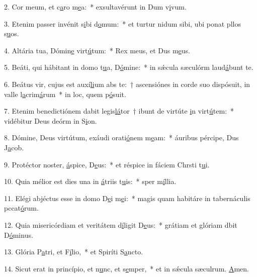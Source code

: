 2. Cor meum, et c\uline{a}ro m\uline{e}a:~* exsultavérunt in Dum v\uline{i}vum.\par 
3. Etenim passer invénit s\uline{i}bi d\uline{o}mum:~* et turtur nidum sibi, ubi ponat pllos s\uline{u}os.\par 
4. Altária tua, Dómin\uline{e} virt\uline{ú}tum:~* Rex meus, et Dus m\uline{e}us.\par 
5. Beáti, qui hábitant in domo t\uline{u}a, D\uline{ó}mine:~* in sǽcula sæculórm laud\uline{á}bunt te.\par 
6. Beátus vir, cujus est auxí\uline{li}um abs te:~† ascensiónes in corde suo dispósuit, in valle l\uline{a}crim\uline{á}rum~* in loc, quem p\uline{ó}suit.\par 
7. Etenim benedictiónem dabit legis\uline{lá}tor~† ibunt de virtúte \uline{i}n virt\uline{ú}tem:~* vidébitur Deus deórm in S\uline{i}on.\par 
8. Dómine, Deus virtútum, exáudi orati\uline{ó}nem m\uline{e}am:~* áuribus pércipe, Dus J\uline{a}cob.\par 
9. Protéctor noster, \uline{á}spice, D\uline{e}us:~* et réspice in fáciem Chrsti t\uline{u}i.\par 
10. Quia mélior est dies una in \uline{á}triis t\uline{u}is:~* sper m\uline{í}llia.\par 
11. Elégi abjéctus esse in domo D\uline{e}i m\uline{e}i:~* magis quam habitáre in tabernáculis pccat\uline{ó}rum.\par 
12. Quia misericórdiam et veritátem d\uline{í}ligit D\uline{e}us:~* grátiam et glóriam dbit D\uline{ó}minus.\par 
13. Glória P\uline{a}tri, et F\uline{í}lio,~* et Spiríti S\uline{a}ncto.\par 
14. Sicut erat in princípio, et n\uline{u}nc, et s\uline{e}mper,~* et in sǽcula sæculrum. \uline{A}men.\par 
